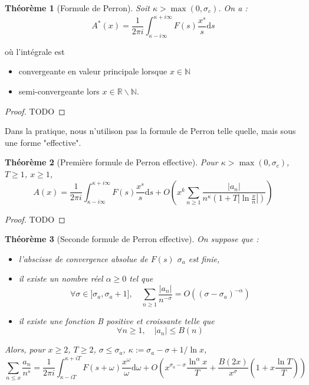 \documentclass[french]{report}
\newtheorem{theorem}{Théorème}[section]
\begin{document}
\begin{theorem}[Formule de Perron]
  Soit $\kappa>\max(0,\sigma_c)$. On a :
  \[ A^*(x) = \frac{1}{2\pi i}\int_{\kappa-i\infty}^{\kappa+i\infty}F(s)\frac{x^s}{s}\mathrm{d}s \]
\end{theorem}

où l'intégrale est
\begin{itemize}
  \item convergeante en valeur principale lorsque $x\in\mathbb{N}$
  \item semi-convergeante lors $x\in\mathbb{R}\backslash\mathbb{N}$.
\end{itemize}

\begin{proof}
  TODO
\end{proof}


Dans la pratique, nous n'utilison pas la formule de Perron telle quelle, mais sous une forme "effective".

\begin{theorem}[Première formule de Perron effective]
  Pour $\kappa>\max(0,\sigma_c)$, $T\geq1$, $x\geq1$,
  \[ A(x) = \frac{1}{2\pi i}\int_{\kappa-i\infty}^{\kappa+i\infty}F(s)\frac{x^s}{s}\mathrm{d}s + O\left(x^k\sum_{n\geq1}\frac{|a_n|}{n^\kappa(1+T|\ln\frac{x}{n}|)}\right) \]
\end{theorem}

\begin{proof}
  TODO
\end{proof}

\begin{theorem}[Seconde formule de Perron effective]\label{eq:perron-2-effective}
  On suppose que :
  \begin{itemize}
    \item l'abscisse de convergence absolue de $F(s)$ $\sigma_a$ est finie,
    \item il existe un nombre réel $\alpha\geq0$ tel que
    \[ \forall\sigma\in]\sigma_a,\sigma_a+1],\quad\sum_{n\geq1}\frac{|a_n|}{n^{-\sigma}}=O((\sigma-\sigma_a)^{-\alpha}) \]
    \item il existe une fonction B positive et croissante telle que
    \[ \forall n\geq1,\quad|a_n|\leq B(n) \]
  \end{itemize}
  Alors, pour $x\geq2$, $T\geq2$, $\sigma\leq\sigma_a$, $\kappa:=\sigma_a-\sigma+1/\ln x$,
  \[ \sum_{n\leq x}\frac{a_n}{n^s}=\frac{1}{2\pi i}\int_{\kappa-iT}^{\kappa+iT}F(s+\omega)\frac{x^\omega}{\omega}\mathrm{d}\omega + O\left(x^{\sigma_a-\sigma}\frac{\ln^\alpha x}{T}+\frac{B(2x)}{x^\sigma}\left(1+x\frac{\ln T}{T}\right)\right) \]
\end{theorem}
\end{document}
